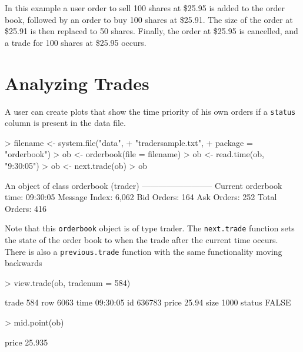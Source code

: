 In this example a user order to sell 100 shares at \$25.95 is added to the
order book, followed by an order to buy 100 shares at \$25.91. The
 size of the order at \$25.91 is then replaced to 50 shares. Finally,
 the order at \$25.95 is cancelled, and a trade for 100 shares
 at \$25.95 occurs.

\section{Analyzing Trades}

A user can create plots that show the time priority of his own orders
if a \texttt{status} column is present in the data file.

\begin{Schunk}
\begin{Sinput}
> filename <- system.file("data",
+                         "tradersample.txt",
+                         package = "orderbook")
> ob <- orderbook(file = filename)
> ob <- read.time(ob, "9:30:05")
> ob <- next.trade(ob)
> ob
\end{Sinput}
\begin{Soutput}
An object of class orderbook (trader)
--------------------------
Current orderbook time:    09:30:05
Message Index:             6,062
Bid Orders:                164
Ask Orders:                252
Total Orders:              416
\end{Soutput}
\end{Schunk}

Note that this \texttt{orderbook} object is of type trader.  The
\texttt{next.trade} function sets the state of the order book to when
the trade after the current time occurs. There is also a
\texttt{previous.trade} function with the same functionality moving
backwards

\begin{Schunk}
\begin{Sinput}
> view.trade(ob, tradenum = 584)
\end{Sinput}
\begin{Soutput}
       trade 584
row         6063
time    09:30:05
id        636783
price      25.94
size        1000
status     FALSE
\end{Soutput}
\begin{Sinput}
> mid.point(ob)
\end{Sinput}
\begin{Soutput}
 price
25.935
\end{Soutput}
\end{Schunk}

